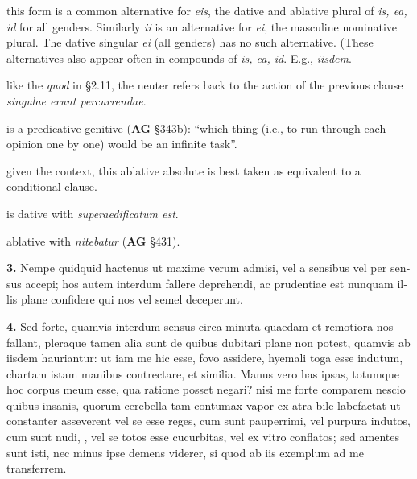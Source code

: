  this form is a common alternative for \textit{eis}, the dative and ablative plural of \textit{is, ea, id} for all genders. Similarly \textit{ii} is an alternative for \textit{ei}, the masculine nominative plural. The dative singular \textit{ei} (all genders) has no such alternative. (These alternatives also appear often in compounds of \textit{is, ea, id}. E.g., \textit{iisdem}.

 like the \textit{quod} in §2.11, the neuter refers back to the action of the previous clause \textit{singulae erunt percurrendae}.

 is a predicative genitive (\textbf{AG} §343b): ``which thing (i.e., to run through each opinion one by one) would be an infinite task''.

 given the context, this ablative absolute is best taken as equivalent to a conditional clause.

 is dative with \textit{superaedificatum est}.

 ablative with \textit{nitebatur} (\textbf{AG} §431).


\clearpage

\beginnumbering
\pstart
\begin{latin}
    \textenglish{\textbf{3.}} Nempe quidquid hactenus ut maxime verum admisi, vel a sensibus vel per sensus accepi; hos autem interdum fallere deprehendi, ac prudentiae est nunquam illis plane confidere qui nos vel semel deceperunt.
\end{latin}
\pend
\endnumbering

\beginnumbering
\pstart
\begin{latin}
    \textenglish{\textbf{4.}} Sed forte, quamvis interdum sensus circa minuta quaedam et remotiora nos fallant, pleraque tamen alia sunt de quibus dubitari plane non potest, quamvis ab iisdem hauriantur: ut iam me hic esse, fovo assidere, hyemali toga esse indutum, chartam istam manibus contrectare, et similia. Manus vero has ipsas, totumque hoc corpus meum esse, qua ratione posset negari? nisi me forte comparem nescio quibus insanis, quorum cerebella tam contumax vapor ex atra bile labefactat ut constanter asseverent vel se esse reges, cum sunt pauperrimi, vel purpura indutos, cum sunt nudi, , vel se totos esse cucurbitas, vel ex vitro conflatos; sed amentes sunt isti, nec minus ipse demens viderer, si quod ab iis exemplum ad me transferrem.
\end{latin}
\pend
\endnumbering

